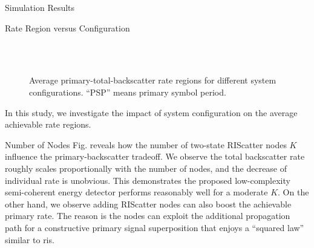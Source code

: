 \documentclass[journal]{IEEEtran}
\begin{document}
\begin{section}{Simulation Results}
	\begin{subsection}{Rate Region versus Configuration}
		\begin{figure}[!t]
			\centering
			\\
			\\
			\caption{
				Average primary-total-backscatter rate regions for different system configurations.
				``PSP'' means primary symbol period.
			}
			\label{fi:region_config}
		\end{figure}
		In this study, we investigate the impact of system configuration on the average achievable rate regions.
		\begin{subsubsection}{Number of Nodes}
			Fig.  reveals how the number of two-state RIScatter nodes $K$ influence the primary-backscatter tradeoff.
			We observe the total backscatter rate roughly scales proportionally with the number of nodes, and the decrease of individual rate is unobvious.
			This demonstrates the proposed low-complexity semi-coherent energy detector performs reasonably well for a moderate $K$.
			On the other hand, we observe adding RIScatter nodes can also boost the achievable primary rate.
			The reason is the nodes can exploit the additional propagation path for a constructive primary signal superposition that enjoys a ``squared law'' similar to \gls{ris}.
		\end{subsubsection}


\end{subsection}
\end{section}
\end{document}
